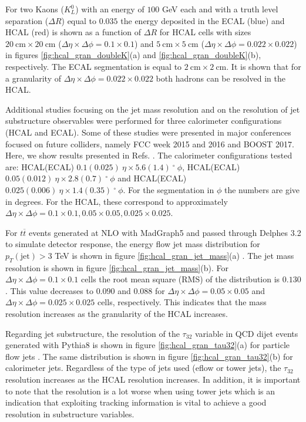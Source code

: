 For two Kaons ($K_L^0$) with an energy of $100$ GeV each and with a truth level separation ($\Delta R$) equal to $0.035$ the energy deposited in the ECAL (blue) and HCAL (red) is shown as a function of $\Delta R$ for HCAL cells with sizes $20~\text{cm}\times 20~\text{cm}$ ($\Delta \eta\times \Delta\phi=0.1\times 0.1$) and $5~\text{cm}\times 5~\text{cm}$ ($\Delta \eta\times \Delta\phi=0.022\times 0.022$) in figures \ref{fig:hcal_gran_doubleK}(a) and \ref{fig:hcal_gran_doubleK}(b), respectively. The ECAL segmentation is equal to $2~\text{cm}\times 2~\text{cm}$. It is shown that for a granularity of $\Delta \eta\times \Delta\phi=0.022\times 0.022$ both hadrons can be resolved in the HCAL.

Additional studies focusing on the jet mass resolution and on the resolution of jet substructure observables were performed for three calorimeter configurations (HCAL and ECAL). Some of these studies were presented in major conferences focused on future colliders, namely FCC week 2015 and 2016 and BOOST 2017. Here, we show results presented in Refs. \cite{FCCweek2015,FCCweek2016,BOOST2017}. The calorimeter configurations tested are: HCAL(ECAL) $0.1(0.025)~\eta \times 5.6(1.4)~^{\circ}~\phi$, HCAL(ECAL) $0.05(0.012)~\eta \times 2.8(0.7)~^{\circ}~\phi$ and HCAL(ECAL) $0.025(0.006)~\eta \times 1.4(0.35)~^{\circ}~\phi$. For the segmentation in $\phi$ the numbers are give in degrees. For the HCAL, these correspond to approximately $\Delta\eta\times\Delta\phi=0.1\times0.1,0.05\times 0.05, 0.025\times0.025$. 

For $t\overline{t}$ events generated at NLO with MadGraph5 and passed through Delphes 3.2 to simulate detector response, the energy flow jet mass distribution for $p_T(\text{jet})>3$ TeV is shown in figure \ref{fig:hcal_gran_jet_mass}(a) \cite{FCCweek2015}. The jet mass resolution is shown in figure \ref{fig:hcal_gran_jet_mass}(b). For $\Delta\eta\times\Delta\phi=0.1\times0.1$ cells the root mean square (RMS) of the distribution is $0.130$. This value decreases to $0.090$ and $0.088$ for $\Delta\eta\times\Delta\phi=0.05\times0.05$ and $\Delta\eta\times\Delta\phi=0.025\times0.025$ cells, respectively. This indicates that the mass resolution increases as the granularity of the HCAL increases.

Regarding jet substructure, the resolution of the $\tau_{32}$ variable in QCD dijet events generated with Pythia8 is shown in figure \ref{fig:hcal_gran_tau32}(a) for particle flow jets \cite{FCCweek2015}. The same distribution is shown in figure \ref{fig:hcal_gran_tau32}(b) for calorimeter jets. Regardless of the type of jets used (eflow or tower jets), the $\tau_{32}$ resolution increases as the HCAL resolution increases. In addition, it is important to note that the resolution is a lot worse when using tower jets which is an indication that exploiting tracking information is vital to achieve a good resolution in substructure variables. 

